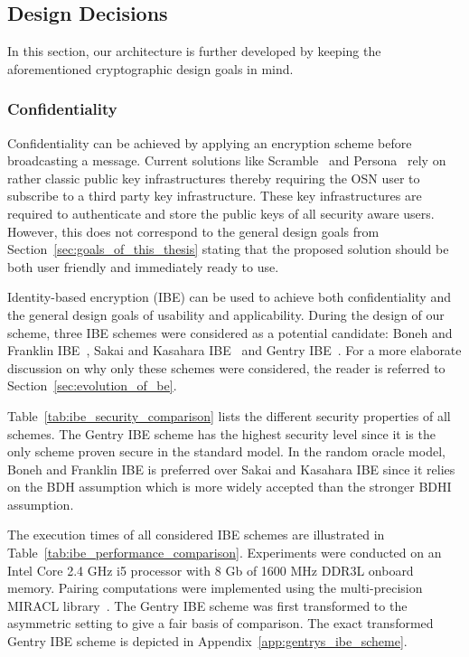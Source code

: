 \subsection{Design Decisions}
\label{sec:design_decisions}
In this section, our architecture is further developed by keeping the aforementioned cryptographic design goals in mind.

\subsubsection{Confidentiality}
Confidentiality can be achieved by applying an encryption scheme before broadcasting a message. Current solutions like Scramble~\cite{art:BeatoKW11} and Persona~\cite{art:BadenBSBS09} rely on rather classic public key infrastructures thereby requiring the OSN user to subscribe to a third party key infrastructure. These key infrastructures are required to authenticate and store the public keys of all security aware users. However, this does not correspond to the general design goals from Section~\ref{sec:goals_of_this_thesis} stating that the proposed solution should be both user friendly and immediately ready to use.

Identity-based encryption (IBE) can be used to achieve both confidentiality and the general design goals of usability and applicability. During the design of our scheme, three IBE schemes were considered as a potential candidate: Boneh and Franklin IBE~\cite{art:BonehF01}, Sakai and Kasahara IBE~\cite{art:SakaiK03} and Gentry IBE~\cite{art:Gentry06}. For a more elaborate discussion on why only these schemes were considered, the reader is referred to Section~\ref{sec:evolution_of_be}.

Table~\ref{tab:ibe_security_comparison} lists the different security properties of all schemes. The Gentry IBE scheme has the highest security level since it is the only scheme proven secure in the standard model. In the random oracle model, Boneh and Franklin IBE is preferred over Sakai and Kasahara IBE since it relies on the BDH assumption which is more widely accepted than the stronger BDHI assumption.

The execution times of all considered IBE schemes are illustrated in Table~\ref{tab:ibe_performance_comparison}. Experiments were conducted on an Intel Core 2.4 GHz i5 processor with 8 Gb of 1600 MHz DDR3L onboard memory. Pairing computations were implemented using the multi-precision MIRACL library~\cite{art:Scott03}. The Gentry IBE scheme was first transformed to the asymmetric setting to give a fair basis of comparison. The exact transformed Gentry IBE scheme is depicted in Appendix~\ref{app:gentrys_ibe_scheme}. 

